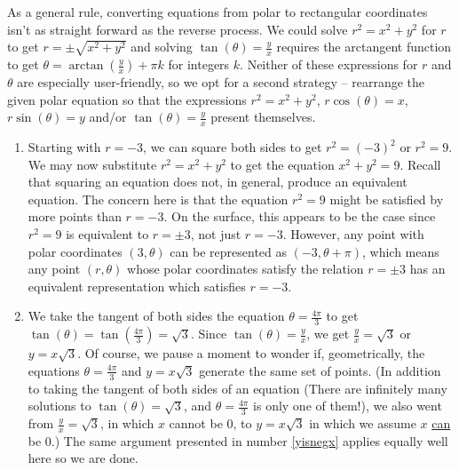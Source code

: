 {As a general rule, converting equations from polar to rectangular coordinates isn't as straight forward as the reverse process.  We could solve $r^2 = x^2 + y^2$ for $r$ to get $r = \pm \sqrt{x^2+y^2}$ and solving $\tan(\theta) = \frac{y}{x}$ requires the arctangent function to get  $\theta = \arctan\left(\frac{y}{x}\right) + \pi k$ for integers $k$.  Neither of these expressions for $r$ and $\theta$ are especially user-friendly, so we opt for a second strategy -- rearrange the given polar equation so that the expressions $r^2 = x^2+y^2$, $r\cos(\theta)=x$,  $r\sin(\theta)=y$ and/or $\tan(\theta) = \frac{y}{x}$ present themselves.

\begin{enumerate}

\item Starting with $r = -3$, we can square both sides to get  $r^2 = (-3)^2$ or $r^2 = 9$.  We may now substitute $r^2 = x^2+y^2$ to get the equation $x^2+y^2 = 9$.  Recall that squaring an equation does not, in general, produce an equivalent equation.  The concern here is that the equation $r^2 = 9$ might be satisfied by more points than $r = -3$.  On the surface, this appears to be the case since $r^2 = 9$ is equivalent to $r = \pm 3$, not just $r=-3$.  However, any point with polar coordinates $(3,\theta)$ can be represented as $(-3,\theta + \pi)$, which means any point $(r,\theta)$ whose polar coordinates satisfy the relation $r = \pm 3$ has an equivalent representation which satisfies $r=-3$.


\item  We take the tangent of both sides the equation $\theta = \frac{4\pi}{3}$ to get $\tan(\theta) = \tan\left(\frac{4\pi}{3}\right) = \sqrt{3}$.  Since $\tan(\theta) = \frac{y}{x}$, we get $\frac{y}{x} = \sqrt{3}$ or $y = x\sqrt{3}$.  Of course, we pause a moment to wonder if, geometrically, the equations $\theta = \frac{4\pi}{3}$ and $y = x\sqrt{3}$ generate the same set of points. (In addition to taking the tangent of both sides of an equation (There are infinitely many solutions to $\tan(\theta) = \sqrt{3}$, and $\theta = \frac{4\pi}{3}$ is only one of them!), we also went from $\frac{y}{x} = \sqrt{3}$, in which $x$ cannot be $0$, to $y = x\sqrt{3}$ in which we assume $x$ \underline{can} be $0$.)  The same argument presented in number \ref{yisnegx} applies equally well here so we are done.


\end{enumerate}}
